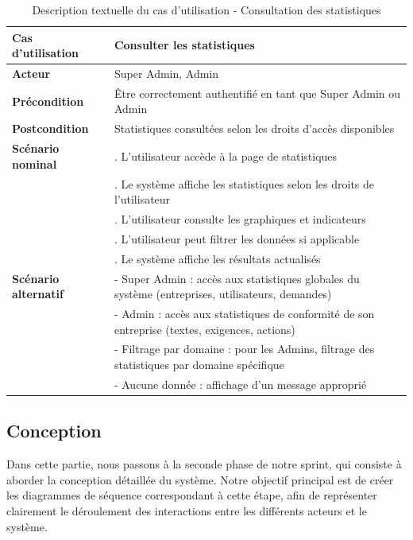 \begin{longtable}{|>{\raggedright\arraybackslash}p{4cm}|>{\raggedright\arraybackslash}p{9cm}|}
\caption{Description textuelle du cas d'utilisation - Consultation des statistiques}
\label{tab:consult_statistics_usecase} \\
\hline
\textbf{Cas d'utilisation} & \textbf{Consulter les statistiques} \\  %
\hline
\textbf{Acteur} & Super Admin, Admin \\
\hline
\textbf{Précondition} & Être correctement authentifié en tant que Super Admin ou Admin \\ %
\hline
\textbf{Postcondition} & Statistiques consultées selon les droits d'accès disponibles \\ %
\hline
\textbf{Scénario nominal} & 
1. L'utilisateur accède à la page de statistiques \\
& 2. Le système affiche les statistiques selon les droits de l'utilisateur \\
& 3. L'utilisateur consulte les graphiques et indicateurs \\
& 4. L'utilisateur peut filtrer les données si applicable \\
& 5. Le système affiche les résultats actualisés \\
\hline
\textbf{Scénario alternatif} & 
- Super Admin : accès aux statistiques globales du système (entreprises, utilisateurs, demandes) \\
& - Admin : accès aux statistiques de conformité de son entreprise (textes, exigences, actions) \\
& - Filtrage par domaine : pour les Admins, filtrage des statistiques par domaine spécifique \\
& - Aucune donnée : affichage d'un message approprié \\
\hline
\end{longtable}

\subsection{Conception}
\noindent Dans cette partie, nous passons à la seconde phase de notre sprint, qui consiste à aborder la conception détaillée du système. Notre objectif principal est de créer les diagrammes de séquence correspondant à cette étape, afin de représenter clairement le déroulement des interactions entre les différents acteurs et le système.


